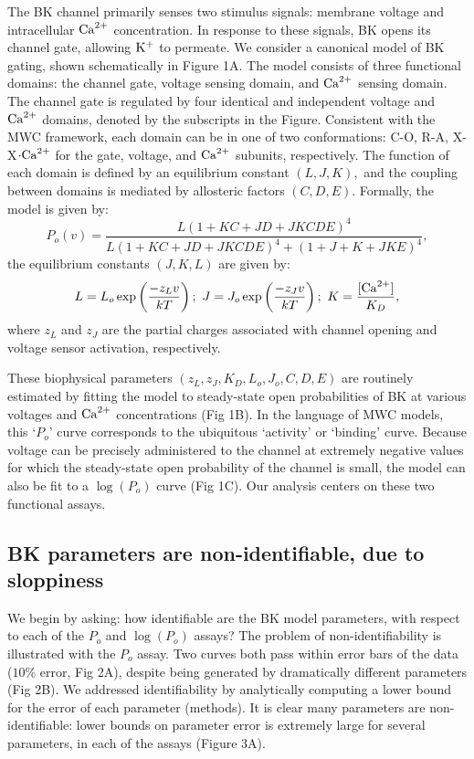 \documentclass[10pt]{amsart}
\newcommand\Po{P_o}
\newcommand\po{P_o}
\newcommand\lpo{\log(\Po)}
\newcommand\ca{\rm{Ca}^{2+}}
\newcommand\kk{\rm{K}^+}
\newcommand\kd{K_D}
\newcommand{\lo}{L_o}
\newcommand{\jo}{J_o}
\newcommand{\zl}{z_L}
\newcommand{\zj}{z_J}
\begin{document}
The BK channel primarily senses two stimulus signals: membrane voltage and intracellular $\ca$ concentration.  In response to these signals, BK opens its channel gate, allowing $\kk$ to permeate.  We consider a canonical model of BK gating, shown schematically in Figure 1A.  The model consists of three functional domains: the channel gate, voltage sensing domain, and $\ca$ sensing domain.  The channel gate is regulated by four identical and independent voltage and $\ca$ domains, denoted by the subscripts in the Figure.  Consistent with the MWC framework, each domain can be in one of two conformations: C-O, R-A, X-X$\cdot\ca$ for the gate, voltage, and $\ca$ subunits, respectively. The function of each domain is defined by an equilibrium constant $(L, J, K),$ and the coupling between domains is mediated by allosteric factors $(C, D, E)$.   Formally, the model is given by:
\begin{equation}\label{aldrich}
\po(v) = \frac{L(1+KC+JD+JKCDE)^4}{L(1+KC+JD+JKCDE)^4+(1+J+K+JKE)^4},
\end{equation}
the equilibrium constants $(J,K,L)$ are given by:
\[
L = \lo\exp\left(\frac{-\zl v}{kT}\right); \ J = \jo\exp\left(\frac{-\zj v}{kT}\right); \ K = \frac{[\ca]}{\kd},
\]
where $\zl$ and $\zj$ are the partial charges associated with channel opening and voltage sensor activation, respectively.

These biophysical parameters $(\zl, \zj,  \kd,  \lo,  \jo, C,  D,  E)$ are routinely estimated by fitting the model to 
steady-state open probabilities of BK at various voltages and $\ca$ concentrations (Fig 1B).  In the language of MWC models, this `$\po$' curve corresponds to the ubiquitous `activity' or `binding' curve.  Because voltage can be precisely administered to the channel at extremely negative values for which the steady-state open probability of the channel is small, the model can also be fit to a $\lpo$ curve (Fig 1C).  Our analysis centers on these two functional assays.

\subsection{BK parameters are non-identifiable, due to sloppiness}

We begin by asking: how identifiable are the BK model parameters, with respect to each of the $\po$ and $\lpo$ assays?  The problem of non-identifiability is illustrated with the $\po$ assay.  Two curves both pass within error bars of the data ($10\%$ error, Fig 2A), despite being generated by dramatically different parameters (Fig 2B).  We addressed identifiability by analytically computing a lower bound for the error of each parameter (methods).  It is clear many parameters are non-identifiable: lower bounds on parameter error is extremely large for several parameters, in each of the assays (Figure 3A).
\end{document}
